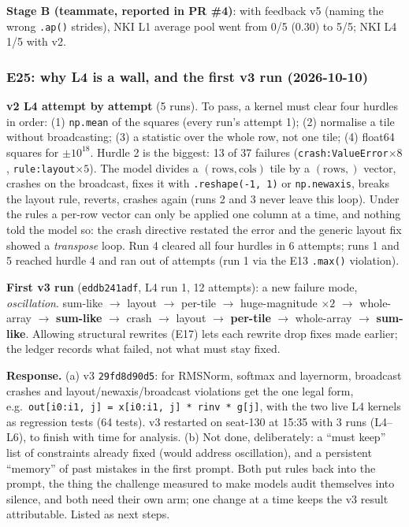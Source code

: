 \documentclass[11pt]{article}
\newcommand{\code}[1]{\texttt{#1}}
\newcommand{\entry}[2]{\subsubsection*{#1 \textnormal{\small(#2)}}}
\begin{document}
\textbf{Stage B (teammate, reported in PR \#4)}: with feedback v5 (naming the wrong \code{.ap()} strides),
NKI L1 average pool went from 0/5 (0.30) to 5/5; NKI L4 1/5 with v2.

\entry{E25: why L4 is a wall, and the first v3 run}{2026-10-10}
\textbf{v2 L4 attempt by attempt} (5 runs). To pass, a kernel must clear four hurdles in order:
(1) \code{np.mean} of the squares (every run's attempt 1); (2) normalise a tile without broadcasting;
(3) a statistic over the whole row, not one tile; (4) float64 squares for $\pm10^{18}$. Hurdle 2 is the
biggest: 13 of 37 failures (\code{crash:ValueError}$\times8$, \code{rule:layout}$\times5$). The model divides
a $(\text{rows},\text{cols})$ tile by a $(\text{rows},)$ vector, crashes on the broadcast, fixes it with
\code{.reshape(-1, 1)} or \code{np.newaxis}, breaks the layout rule, reverts, crashes again (runs 2
and 3 never leave this loop). Under the rules a per-row vector can only be applied one column at a
time, and nothing told the model so: the crash directive restated the error and the generic layout
fix showed a \emph{transpose} loop. Run 4 cleared all four hurdles in 6 attempts; runs 1 and 5 reached
hurdle 4 and ran out of attempts (run 1 via the E13 \code{.max()} violation).

\textbf{First v3 run} (\code{eddb241adf}, L4 run 1, 12 attempts): a new failure mode, \emph{oscillation}.
sum-like $\to$ layout $\to$ per-tile $\to$ huge-magnitude $\times2$ $\to$ whole-array $\to$ \textbf{sum-like}
$\to$ crash $\to$ layout $\to$ \textbf{per-tile} $\to$ whole-array $\to$ \textbf{sum-like}. Allowing
structural rewrites (E17) lets each rewrite drop fixes made earlier; the ledger records what failed,
not what must stay fixed.

\textbf{Response.} (a) v3 \code{29fd8d90d5}: for RMSNorm, softmax and layernorm, broadcast crashes and
layout/newaxis/broadcast violations get the one legal form, e.g.\
\code{out[i0:i1, j] = x[i0:i1, j] * rinv * g[j]}, with the two live L4 kernels as regression tests
(64 tests). v3 restarted on seat-130 at 15:35 with 3 runs (L4--L6), to finish with time for analysis.
(b) Not done, deliberately: a ``must keep'' list of constraints already fixed (would address
oscillation), and a persistent ``memory'' of past mistakes in the first prompt. Both put rules back
into the prompt, the thing the challenge measured to make models audit themselves into silence, and
both need their own arm; one change at a time keeps the v3 result attributable. Listed as next steps.
\end{document}

